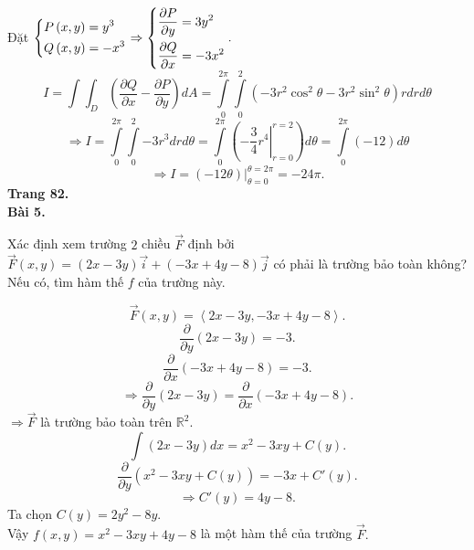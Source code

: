 \documentclass[12pt,a4paper]{article}
\begin{document}
Đặt \(\left\{ \begin{gathered}
  P\left( {x,y} \right) = {y^3} \hfill \\
  Q\left( {x,y} \right) =  - {x^3} \hfill \\ 
\end{gathered}  \right. \Rightarrow \left\{ \begin{gathered}
  \frac{{\partial P}}{{\partial y}} = 3{y^2} \hfill \\
  \frac{{\partial Q}}{{\partial x}} =  - 3{x^2} \hfill \\ 
\end{gathered}  \right..\)
\[I = \int {\int_D {\left( {\frac{{\partial Q}}{{\partial x}} - \frac{{\partial P}}{{\partial y}}} \right)} } dA = \int\limits_0^{2\pi } {\int\limits_0^2 {\left( { - 3{r^2}{{\cos }^2}\theta  - 3{r^2}{{\sin }^2}\theta } \right)rdrd\theta } } \]
\[ \Rightarrow I = \int\limits_0^{2\pi } {\int\limits_0^2 { - 3{r^3}drd\theta }  = \int\limits_0^{2\pi } {\left( {\left. { - \frac{3}{4}{r^4}} \right|_{r = 0}^{r = 2}} \right)d\theta }  = \int\limits_0^{2\pi } {\left( { - 12} \right)d\theta } } \]
\[ \Rightarrow I = \left. {\left( { - 12\theta } \right)} \right|_{\theta  = 0}^{\theta  = 2\pi } =  - 24\pi .\]
\textbf{Trang 82.}\\
\textbf{Bài 5.}
\begin{mybox}
Xác định xem trường \(2\) chiều \(\overrightarrow{F}\) định bởi \(\overrightarrow F \left( {x,y} \right) = \left( {2x - 3y} \right)\overrightarrow i  + \left( { - 3x + 4y - 8} \right)\overrightarrow j \) có phải là trường bảo toàn không? Nếu có, tìm hàm thế \(f\) của trường này.
\end{mybox}
\[\overrightarrow F \left( {x,y} \right) = \left\langle {2x - 3y, - 3x + 4y - 8} \right\rangle .\]
\[\frac{\partial }{{\partial y}}\left( {2x - 3y} \right) =  - 3.\]
\[\frac{\partial }{{\partial x}}\left( { - 3x + 4y - 8} \right) =  - 3.\]
\[ \Rightarrow \frac{\partial }{{\partial y}}\left( {2x - 3y} \right) = \frac{\partial }{{\partial x}}\left( { - 3x + 4y - 8} \right).\]
\( \Rightarrow \overrightarrow F \) là trường bảo toàn trên \(\mathbb{R} ^2.\)
\[\int {\left( {2x - 3y} \right)dx}  = {x^2} - 3xy + C\left( y \right).\]
\[\frac{\partial }{{\partial y}}\left( {{x^2} - 3xy + C\left( y \right)} \right) =  - 3x + C'\left( y \right).\]
\[ \Rightarrow C'\left( y \right) = 4y - 8.\]
Ta chọn \(C\left( y \right) = 2{y^2} - 8y.\)\\
Vậy \(f\left( {x,y} \right) = {x^2} - 3xy + 4y - 8\) là một hàm thế của trường \(\overrightarrow{F}.\)\\
\end{document}
